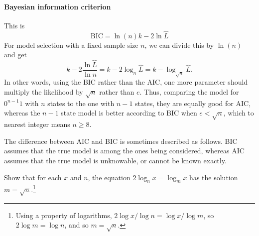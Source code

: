 		\paragraph{Bayesian information criterion} This  is
		\[
			\mathrm{BIC} = \ln(n)k-2 \ln\hat L
		\]
		For model selection with a fixed sample size $n$, we can divide this by $\ln(n)$ and get
		\[
			k - 2\frac{\ln\hat L}{\ln n} = k - 2\log_n\hat L = k-\log_{\sqrt n}\hat L.
		\]
		In other words, using the BIC rather than the AIC, one more parameter should multiply the likelihood by $\sqrt n$ rather than $e$. Thus, comparing the model for $0^{n-1}1$ with $n$ states to the one with $n-1$ states, they are equally good for AIC, whereas the $n-1$ state model is better according to BIC when $e<\sqrt n$, which to nearest integer means $n\ge 8$.
		
		The difference between AIC and BIC is sometimes described as follows. BIC assumes that the true model is among the ones being considered, whereas AIC assumes that the true model is unknowable, or cannot be known exactly.
		\begin{exercise}
			Show that for each $x$ and $n$, the equation $2\log_n x = \log_m x$ has the solution $m=\sqrt{n}$.\footnote{Using a property of logarithms, $2\log x/\log n = \log x/\log m$, so $2\log m = \log n$, and so $m = \sqrt{n}$.}
		\end{exercise}



